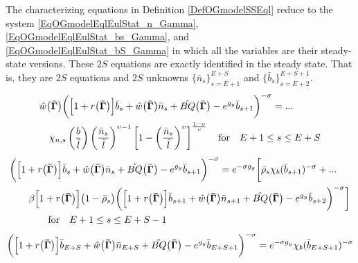 \documentclass[letterpaper,12pt]{article}
\theoremstyle{definition}
\begin{document}
    The characterizing equations in Definition \ref{DefOGmodelSSEql} reduce to the system \eqref{EqOGmodelEqlEulStat_n_Gamma}, \eqref{EqOGmodelEqlEulStat_bs_Gamma}, and \eqref{EqOGmodelEqlEulStat_bS_Gamma} in which all the variables are their steady-state versions. These $2S$ equations are exactly identified in the steady state. That is, they are $2S$ equations and $2S$ unknowns $\{\bar{n}_s\}_{s=E+1}^{E+S}$ and $\{\bar{b}_s\}_{s=E+2}^{E+S+1}$.
    \begin{equation}\label{EqOGmodelEqlEulStat_n_GammaSS}
      \begin{split}
        &\hat{w}\bigl(\bm{\bar{\Gamma}}\bigr)\biggl(\Bigl[1 + r\bigl(\bm{\bar{\Gamma}}\bigr)\Bigr]\bar{b}_{s} + \hat{w}\bigl(\bm{\bar{\Gamma}}\bigr)\bar{n}_{s} + \hat{BQ}\bigl(\bm{\bar{\Gamma}}\bigr) - e^{g_y}\bar{b}_{s+1}\biggr)^{-\sigma} = ...  \\
        & \quad \chi_{n,s}\left(\frac{b}{\tilde{l}}\right)\left(\frac{\bar{n}_{s}}{\tilde{l}}\right)^{\upsilon - 1}\left[1 - \left(\frac{\bar{n}_{s}}{\tilde{l}}\right)^\upsilon\right]^\frac{1-\upsilon}{\upsilon} \quad\text{for}\quad E+1\leq s\leq E+S
      \end{split}
    \end{equation}
    \begin{equation}\label{EqOGmodelEqlEulStat_bs_GammaSS}
      \begin{split}
        &\biggl(\Bigl[1 + r\bigl(\bm{\bar{\Gamma}}\bigr)\Bigr]\bar{b}_{s} + \hat{w}\bigl(\bm{\bar{\Gamma}}\bigr)\bar{n}_{s} + \hat{BQ}\bigl(\bm{\bar{\Gamma}}\bigr) - e^{g_y}\bar{b}_{s+1}\biggr)^{-\sigma} = e^{-\sigma g_y}\biggl[\bar{\rho}_s \chi_b(\bar{b}_{s+1})^{-\sigma} + ... \\
        &\quad\quad\beta\Bigl[1+r\bigl(\bm{\bar{\Gamma}}\bigr)\Bigr]\bigl(1 - \bar{\rho}_s\bigr)\biggl(\Bigl[1 + r\bigl(\bm{\bar{\Gamma}}\bigr)\Bigr]\bar{b}_{s+1} + \hat{w}\bigl(\bm{\bar{\Gamma}}\bigr)\bar{n}_{s+1} + \hat{BQ}\bigl(\bm{\bar{\Gamma}}\bigr) - e^{g_y}\bar{b}_{s+2}\biggr)^{-\sigma}\biggr] \\
        &\qquad\qquad\text{for}\quad E+1\leq s\leq E+S-1
      \end{split}
    \end{equation}
    \begin{equation}\label{EqOGmodelEqlEulStat_bS_GammaSS}
      \biggl(\Bigl[1 + r\bigl(\bm{\bar{\Gamma}}\bigr)\Bigr]\bar{b}_{E+S} + \hat{w}\bigl(\bm{\bar{\Gamma}}\bigr)\bar{n}_{E+S} + \hat{BQ}\bigl(\bm{\bar{\Gamma}}\bigr) - e^{g_y}\bar{b}_{E+S+1}\biggr)^{-\sigma} = e^{-\sigma g_y}\chi_b(\bar{b}_{E+S+1})^{-\sigma}
    \end{equation}
\end{document}
